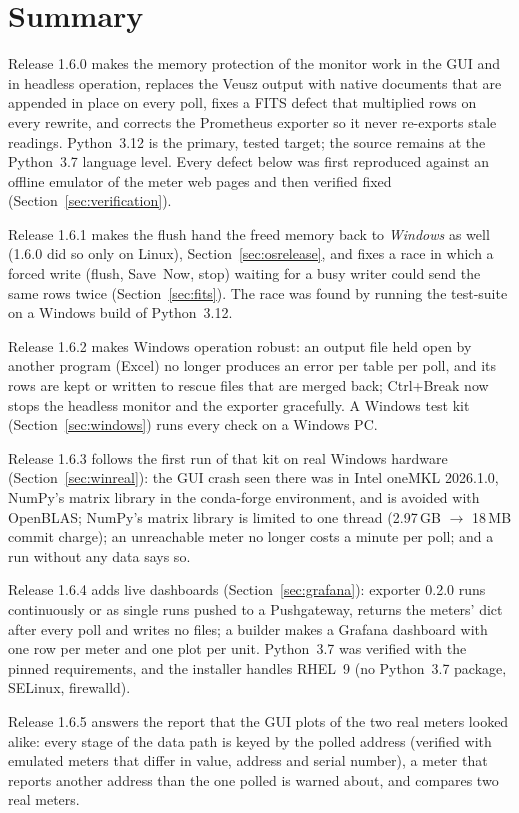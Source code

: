 \documentclass[11pt,a4paper]{article}
\newcommand{\code}[1]{\texttt{\detokenize{#1}}}
\begin{document}
\section{Summary}
Release 1.6.0 makes the memory protection of the monitor work in the GUI and
in headless operation, replaces the Veusz output with native \code{.vszh5}
documents that are appended in place on every poll, fixes a FITS defect that
multiplied rows on every rewrite, and corrects the Prometheus exporter so it
never re-exports stale readings. Python~3.12 is the primary, tested target;
the source remains at the Python~3.7 language level. Every defect below was
first reproduced against an offline emulator of the meter web pages and then
verified fixed (Section~\ref{sec:verification}).

Release 1.6.1 makes the flush hand the freed memory back to \emph{Windows}
as well (1.6.0 did so only on Linux), Section~\ref{sec:osrelease}, and fixes a
race in which a forced write (flush, Save~Now, stop) waiting for a busy writer
could send the same rows twice (Section~\ref{sec:fits}). The race was found by
running the test-suite on a Windows build of Python~3.12.

Release 1.6.2 makes Windows operation robust: an output file held open by
another program (Excel) no longer produces an error per table per poll, and
its rows are kept or written to rescue files that are merged back; Ctrl+Break
now stops the headless monitor and the exporter gracefully. A Windows test
kit (Section~\ref{sec:windows}) runs every check on a Windows PC.

Release 1.6.3 follows the first run of that kit on real Windows hardware
(Section~\ref{sec:winreal}): the GUI crash seen there was in Intel oneMKL
2026.1.0, NumPy's matrix library in the conda-forge environment, and is
avoided with OpenBLAS; NumPy's matrix library is limited to one thread
(2.97\,GB $\rightarrow$ 18\,MB commit charge); an unreachable meter no longer
costs a minute per poll; and a run without any data says so.

Release 1.6.4 adds live dashboards (Section~\ref{sec:grafana}): exporter
0.2.0 runs continuously or as single runs pushed to a Pushgateway, returns
the meters' dict after every poll and writes no files; a builder makes a
Grafana dashboard with one row per meter and one plot per unit. Python~3.7
was verified with the pinned requirements, and the installer handles
RHEL~9 (no Python~3.7 package, SELinux, firewalld).

Release 1.6.5 answers the report that the GUI plots of the two real meters
looked alike: every stage of the data path is keyed by the polled address
(verified with emulated meters that differ in value, address and serial
number), a meter that reports another address than the one polled is
warned about, and \code{ab_check_meters.py} compares two real meters.
\end{document}
